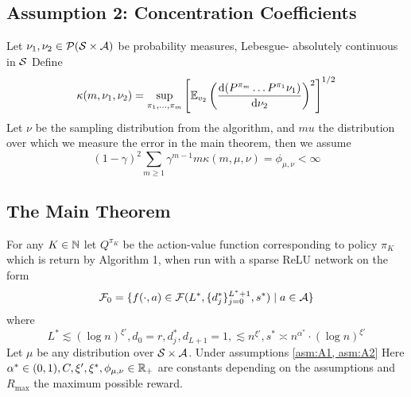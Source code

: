 \subsection{Assumption 2: Concentration Coefficients}
\begin{Assumption}\label{asm:A2}
	Let $\nu_1, \nu_2 \in \mathcal{P}(\mathcal{S}\times \mathcal{A})$ be probability measures,
	Lebesgue- absolutely continuous in $\mathcal{S}$
	Define
	\[ \kappa(m, \nu_1, \nu_2) = \sup_{\pi_1, \dots, \pi_m}
		\left[ \mathbb{E}_{v_2} \left( \frac{\mathrm{d} (P^{\pi_m} \dots P^{\pi_1} \nu_1)}
		{\mathrm{d} \nu_2} \right)^2 \right]^{1/2} \]
	Let $\nu$ be the sampling distribution from the algorithm, and $mu$ the distribution
	over which we measure the error in the main theorem, then we assume
	\[ (1 - \gamma)^2 \sum_{m\geq 1} \gamma^{m-1} m \kappa(m, \mu, \nu)
		= \phi_{\mu, \nu} < \infty \]
\end{Assumption}

\subsection{The Main Theorem}
\begin{Theorem}
	For any $K \in \mathbb{N}$ let $Q^{\pi_K}$ be the action-value function
	corresponding to policy $\pi_K$ which is return by Algorithm 1,
	when run with a sparse ReLU network on the form
	\[ \mathcal{F}_0 = \{f(\cdot, a) \in \mathcal{F}(L^*, \{d_j^*\}_{j=0}^{L^*+1},s^*)
		\mid a \in \mathcal{A} \} \]
	where
	\[ L^* \lesssim (\log n)^{\xi'}, d_0 = r, d_j^*, d_{L+1}=1, \lesssim n^{\xi'},
		s^* \asymp n^{\alpha^*} \cdot (\log n)^{\xi'} \]
	Let $\mu$ be any distribution over $\mathcal{S} \times \mathcal{A}$.
	Under assumptions \cref{asm:A1, asm:A2} 
	Here $\alpha^* \in (0,1), C, \xi', \xi^*, \phi_{\mu,\nu} \in \mathbb{R}_{+}$
	are constants depending on the assumptions
	and $R_{\max}$ the maximum possible reward.
\end{Theorem}

